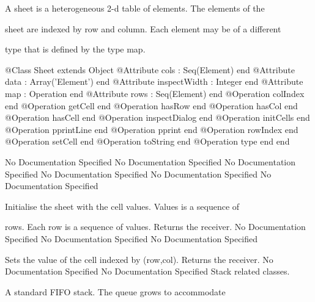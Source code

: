       A sheet is a heterogeneous 2-d table of elements. The elements of the

      sheet are indexed by row and column. Each element may be of a different

      type that is defined by the type map.
\begin{Interface}
@Class Sheet extends Object
  @Attribute cols : Seq(Element) end
  @Attribute data : Array('Element') end
  @Attribute inspectWidth : Integer end
  @Attribute map : Operation end
  @Attribute rows : Seq(Element) end
  @Operation colIndex end
  @Operation getCell end
  @Operation hasRow end
  @Operation hasCol end
  @Operation hasCell end
  @Operation inspectDialog end
  @Operation initCells end
  @Operation pprintLine end
  @Operation pprint end
  @Operation rowIndex end
  @Operation setCell end
  @Operation toString end
  @Operation type end
end
\end{Interface}
No Documentation Specified
No Documentation Specified
No Documentation Specified
No Documentation Specified
No Documentation Specified
No Documentation Specified

        Initialise the sheet with the cell values. Values is a sequence of

        rows. Each row is a sequence of values. Returns the receiver.
No Documentation Specified
No Documentation Specified
No Documentation Specified

        Sets the value of the cell indexed by (row,col).
        Returns the receiver.
No Documentation Specified
No Documentation Specified
Stack related classes.

      A standard FIFO stack. The queue grows to accommodate

